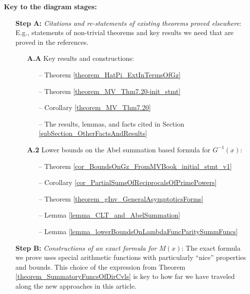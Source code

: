 \documentclass[11pt,reqno,a4letter]{article}
\numberwithin{figure}{section}
\numberwithin{table}{section}
\theoremstyle{plain}
\numberwithin{theorem}{section}
\theoremstyle{definition}
\begin{document}
\noindent 
\textbf{Key to the diagram stages:} \\ 
\begin{itemize}[noitemsep,topsep=0pt]

\item[\textbf{Step A:}] \textit{Citations and re-statements of existing theorems proved elsewhere}: 
     E.g., statements of non-trivial theorems and key results we need that are proved in the references. 
     \begin{itemize}[noitemsep,topsep=0pt] 
     \item[\textbf{A.A}] Key results and constructions: 
          \begin{itemize}[noitemsep,topsep=0pt]
          \item[--] \small{Theorem \ref{theorem_HatPi_ExtInTermsOfGz}} 
          \item[--] \small{Theorem \ref{theorem_MV_Thm7.20-init_stmt}} 
          \item[--] \small{Corollary \ref{theorem_MV_Thm7.20}} 
          \item[--] \small{The results, lemmas, and facts cited in Section \ref{subSection_OtherFactsAndResults}}
          \end{itemize} 
     \item[\textbf{A.2}] Lower bounds on the Abel summation based formula for $G^{-1}(x)$: 
          \begin{itemize}[noitemsep,topsep=0pt]
          \item[--] \small{Theorem \ref{cor_BoundsOnGz_FromMVBook_initial_stmt_v1}} 
          \item[--] \small{Corollary \ref{cor_PartialSumsOfReciprocalsOfPrimePowers}} 
          \item[--] \small{Theorem \ref{theorem_gInv_GeneralAsymptoticsForms}} 
          \item[--] \small{Lemma \ref{lemma_CLT_and_AbelSummation}} 
          \item[--] \small{Lemma \ref{lemma_lowerBoundsOnLambdaFuncParitySummFuncs}} 
          \end{itemize} 
     \end{itemize} 
\item[\textbf{Step B:}] \textit{Constructions of an exact formula for $M(x)$}: The exact formula we prove 
     uses special arithmetic functions with particularly ``nice'' properties and bounds. This choice of 
     the expression from Theorem \ref{theorem_SummatoryFuncsOfDirCvls} 
     is key to how far we have traveled along the new approaches in this article. 

\end{itemize}
\end{document}
